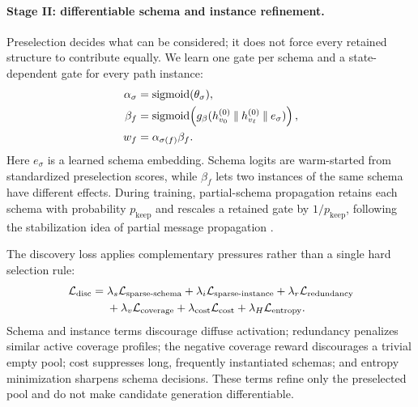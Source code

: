 \paragraph{Stage II: differentiable schema and instance refinement.}
Preselection decides what can be considered; it does not force every retained structure to
contribute equally.  We learn one gate per schema and a state-dependent gate for every path
instance:
\begin{equation}
  \begin{aligned}
  \alpha_\sigma&=\operatorname{sigmoid}(\theta_\sigma),\\
  \beta_f&=\operatorname{sigmoid}\!\left(
    g_\beta(h_{v_0}^{(0)}\mathbin\Vert h_{v_\ell}^{(0)}\mathbin\Vert e_\sigma)
  \right),\\
  w_f&=\alpha_{\sigma(f)}\beta_f .
  \end{aligned}
  \label{eq:gates}
\end{equation}
Here \(e_\sigma\) is a learned schema embedding.  Schema logits are warm-started from standardized
preselection scores, while \(\beta_f\) lets two instances of the same schema have different
effects.  During training, partial-schema propagation retains each schema with probability
\(p_{\mathrm{keep}}\) and rescales a retained gate by \(1/p_{\mathrm{keep}}\), following the
stabilization idea of partial message propagation \cite{li2023pmmm}.

The discovery loss applies complementary pressures rather than a single hard selection rule:
\begin{equation}
  \begin{aligned}
  \mathcal{L}_{\mathrm{disc}}={}&
  \lambda_s\mathcal{L}_{\mathrm{sparse\text{-}schema}}
  +\lambda_i\mathcal{L}_{\mathrm{sparse\text{-}instance}}
  +\lambda_r\mathcal{L}_{\mathrm{redundancy}}\\
  &+\lambda_v\mathcal{L}_{\mathrm{coverage}}
  +\lambda_{\mathrm{cost}}\mathcal{L}_{\mathrm{cost}}
  +\lambda_H\mathcal{L}_{\mathrm{entropy}} .
  \end{aligned}
  \label{eq:discovery-loss}
\end{equation}
Schema and instance terms discourage diffuse activation; redundancy penalizes similar active
coverage profiles; the negative coverage reward discourages a trivial empty pool; cost suppresses
long, frequently instantiated schemas; and entropy minimization sharpens schema decisions.  These
terms refine only the preselected pool and do not make candidate generation differentiable.

